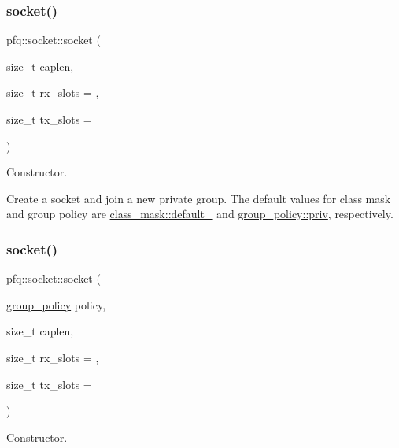 \subsubsection{\texorpdfstring{socket()}{socket()}\hspace{0.1cm}{\footnotesize\ttfamily [3/7]}}
{\footnotesize\ttfamily pfq\+::socket\+::socket (\begin{DoxyParamCaption}\item[{size\+\_\+t}]{caplen,  }\item[{size\+\_\+t}]{rx\+\_\+slots = {},  }\item[{size\+\_\+t}]{tx\+\_\+slots = {} }\end{DoxyParamCaption})\hspace{0.3cm}{\ttfamily [inline]}}



Constructor. 

Create a socket and join a new private group. The default values for class mask and group policy are \hyperlink{namespacepfq_a96af1f5ed530eff563eb917516758fbba172b03053216c6158fe380805998ad6c}{class\+\_\+mask\+::default\+\_\+} and \hyperlink{namespacepfq_ac41249c8510558905b01fa4d866a38d7a908b453051b556e053731714a5193921}{group\+\_\+policy\+::priv}, respectively. \mbox{\label{classpfq_1_1socket_a419985e445525a7dbfae6d9ace452427}} 
\subsubsection{\texorpdfstring{socket()}{socket()}\hspace{0.1cm}{\footnotesize\ttfamily [4/7]}}
{\footnotesize\ttfamily pfq\+::socket\+::socket (\begin{DoxyParamCaption}\item[{\hyperlink{namespacepfq_ac41249c8510558905b01fa4d866a38d7}{group\+\_\+policy}}]{policy,  }\item[{size\+\_\+t}]{caplen,  }\item[{size\+\_\+t}]{rx\+\_\+slots = {},  }\item[{size\+\_\+t}]{tx\+\_\+slots = {} }\end{DoxyParamCaption})\hspace{0.3cm}{\ttfamily [inline]}}



Constructor. 

